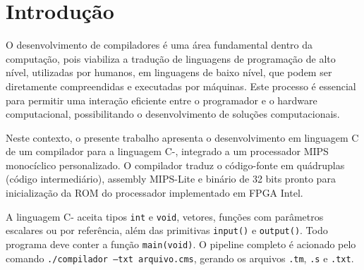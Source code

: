 \documentclass[
	12pt,				%
	openright,			%
	a4paper,			%
	english,			%
	french,				%
	spanish,			%
	brazil,				%
	]{abntex2}
\begin{document}

\frenchspacing 


\imprimircapa

\imprimirfolhaderosto*

\listoffigures*
\clearpage

\listoftables*
\clearpage

\tableofcontents*


\textual

\chapter{Introdução}
O desenvolvimento de compiladores é uma área fundamental dentro da computação, pois viabiliza a tradução de linguagens de programação de alto nível, utilizadas por humanos, em linguagens de baixo nível, que podem ser diretamente compreendidas e executadas por máquinas. Este processo é essencial para permitir uma interação eficiente entre o programador e o hardware computacional, possibilitando o desenvolvimento de soluções computacionais.

Neste contexto, o presente trabalho apresenta o desenvolvimento em linguagem C de um compilador para a linguagem C-, integrado a um processador MIPS monocíclico personalizado. O compilador traduz o código-fonte em quádruplas (código intermediário), assembly MIPS-Lite e binário de 32 bits pronto para inicialização da ROM do processador implementado em FPGA Intel.

A linguagem C- aceita tipos \texttt{int} e \texttt{void}, vetores, funções com parâmetros escalares ou por referência, além das primitivas \texttt{input()} e \texttt{output()}. Todo programa deve conter a função \texttt{main(void)}. O pipeline completo é acionado pelo comando \texttt{./compilador --txt arquivo.cms}, gerando os arquivos \texttt{.tm}, \texttt{.s} e \texttt{.txt}.
\end{document}

